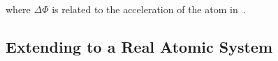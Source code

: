 where $\Delta \Phi$ is related to the acceleration of the atom
in~.
\subsection{Extending to a Real Atomic System}

